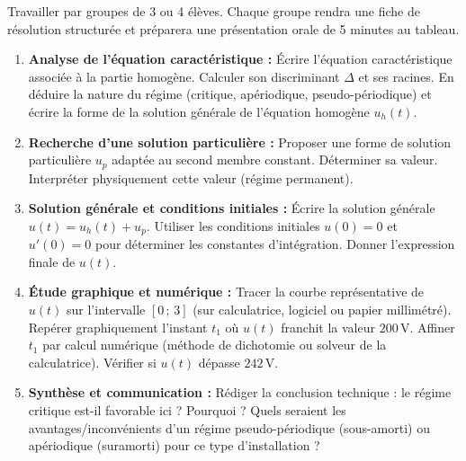 \documentclass[11pt]{article}
\newcounter{popsec}
\newcounter{popsub}
\newcommand{\courssub}[1]{%
  \stepcounter{popsub}%
  \par\vspace{9pt}\noindent{\popxbold\fontsize{11.5}{13}\selectfont\color{popink}{\color{poporange}\thepopsec.\thepopsub}\hspace{6pt}#1}\par\nopagebreak\vspace{4pt}
}
\begin{document}
\courssub{Consignes}
Travailler par groupes de 3 ou 4 élèves. Chaque groupe rendra une fiche de résolution structurée et préparera une présentation orale de 5 minutes au tableau.
\begin{enumerate}
    \item \textbf{Analyse de l'équation caractéristique :} Écrire l'équation caractéristique associée à la partie homogène. Calculer son discriminant $\Delta$ et ses racines. En déduire la nature du régime (critique, apériodique, pseudo-périodique) et écrire la forme de la solution générale de l'équation homogène $u_h(t)$.
    \item \textbf{Recherche d'une solution particulière :} Proposer une forme de solution particulière $u_p$ adaptée au second membre constant. Déterminer sa valeur. Interpréter physiquement cette valeur (régime permanent).
    \item \textbf{Solution générale et conditions initiales :} Écrire la solution générale $u(t) = u_h(t) + u_p$. Utiliser les conditions initiales $u(0)=0$ et $u'(0)=0$ pour déterminer les constantes d'intégration. Donner l'expression finale de $u(t)$.
    \item \textbf{Étude graphique et numérique :} Tracer la courbe représentative de $u(t)$ sur l'intervalle $[0\,;\,3]$ (sur calculatrice, logiciel ou papier millimétré). Repérer graphiquement l'instant $t_1$ où $u(t)$ franchit la valeur $200\,\text{V}$. Affiner $t_1$ par calcul numérique (méthode de dichotomie ou solveur de la calculatrice). Vérifier si $u(t)$ dépasse $242\,\text{V}$.
    \item \textbf{Synthèse et communication :} Rédiger la conclusion technique : le régime critique est-il favorable ici ? Pourquoi ? Quels seraient les avantages/inconvénients d'un régime pseudo-périodique (sous-amorti) ou apériodique (suramorti) pour ce type d'installation ?
\end{enumerate}
\end{document}
